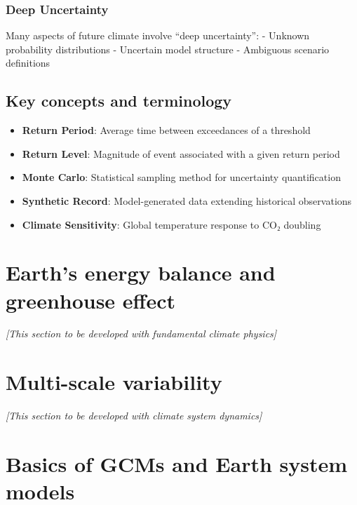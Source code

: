 \documentclass[
  letterpaper,
  DIV=11,
  numbers=noendperiod]{scrreprt}
\providecommand{\tightlist}{%
  \setlength{\itemsep}{0pt}\setlength{\parskip}{0pt}}
\begin{document}
\subsubsection{Deep Uncertainty}\label{deep-uncertainty}

Many aspects of future climate involve ``deep uncertainty'': - Unknown
probability distributions - Uncertain model structure - Ambiguous
scenario definitions

\subsection{Key concepts and
terminology}\label{key-concepts-and-terminology}

\begin{itemize}
\tightlist
\item
  \textbf{Return Period}: Average time between exceedances of a
  threshold
\item
  \textbf{Return Level}: Magnitude of event associated with a given
  return period\\
\item
  \textbf{Monte Carlo}: Statistical sampling method for uncertainty
  quantification
\item
  \textbf{Synthetic Record}: Model-generated data extending historical
  observations
\item
  \textbf{Climate Sensitivity}: Global temperature response to CO₂
  doubling
\end{itemize}

\section{Earth's energy balance and greenhouse
effect}\label{earths-energy-balance-and-greenhouse-effect}

\emph{{[}This section to be developed with fundamental climate
physics{]}}

\section{Multi-scale variability}\label{multi-scale-variability}

\emph{{[}This section to be developed with climate system dynamics{]}}

\section{Basics of GCMs and Earth system
models}\label{basics-of-gcms-and-earth-system-models}
\end{document}
